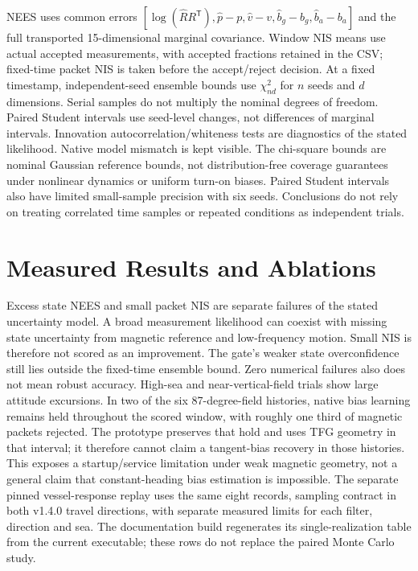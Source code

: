 \documentclass[conference]{IEEEtran}
\newcommand{\tr}{^{\mathsf T}}
\begin{document}
NEES uses common errors
$[\log(\hat RR\tr),\hat p-p,\hat v-v,\hat b_g-b_g,\hat b_a-b_a]$ and the
full transported 15-dimensional marginal covariance. Window NIS means use
actual accepted measurements, with accepted fractions retained in the CSV;
fixed-time packet NIS is taken before the accept/reject decision. At a fixed timestamp, independent-seed
ensemble bounds use $\chi^2_{nd}$ for $n$ seeds and $d$ dimensions. Serial
samples do not multiply the nominal degrees of freedom. Paired Student
intervals use seed-level changes, not differences of marginal intervals.
Innovation autocorrelation/whiteness tests are diagnostics of the stated
likelihood. Native model mismatch is kept visible.
The chi-square bounds are nominal Gaussian reference bounds, not
distribution-free coverage guarantees under nonlinear dynamics or uniform
turn-on biases. Paired Student intervals also have limited small-sample
precision with six seeds. Conclusions do not rely on treating correlated
time samples or repeated conditions as independent trials.

\section{Measured Results and Ablations}
\StudyCohort
\PrimaryResultsTable
\BiasResultsTable
\PairedResultsTable
\ConsistencyResultsTable
\RecoveryResultsTable
\RobustnessResultsTable
\CostResultsTable
\TimingResultsTable
\AblationResultsTable
\StudyInterpretation
Excess state NEES and small packet NIS are separate failures of the stated
uncertainty model. A broad measurement likelihood can coexist with missing
state uncertainty from magnetic reference and low-frequency motion. Small
NIS is therefore not scored as an improvement. The gate's weaker state
overconfidence still lies outside the fixed-time ensemble bound.
Zero numerical failures also does not mean robust accuracy. High-sea and
near-vertical-field trials show large attitude excursions. In two of the
six 87-degree-field histories, native bias learning remains held throughout
the scored window, with roughly one third of magnetic packets rejected.
The prototype preserves that hold and uses TFG geometry in that interval;
it therefore cannot claim a tangent-bias recovery in those histories.
This exposes a startup/service limitation under weak magnetic geometry,
not a general claim that constant-heading bias estimation is impossible.
The separate pinned vessel-response replay uses the same eight records,
sampling contract in both v1.4.0 travel directions, with separate measured
limits for each filter, direction and sea. The documentation build
regenerates its single-realization table from the current executable;
these rows do not replace the paired Monte Carlo study.

\end{document}
